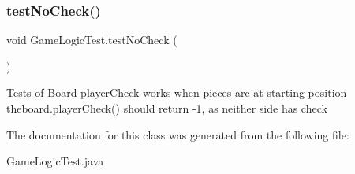 \subsubsection{\texorpdfstring{testNoCheck()}{testNoCheck()}}
{\footnotesize\ttfamily void Game\+Logic\+Test.\+test\+No\+Check (\begin{DoxyParamCaption}{ }\end{DoxyParamCaption})\hspace{0.3cm}{\ttfamily [inline]}}

Tests of \mbox{\hyperlink{class_board}{Board}} player\+Check works when pieces are at starting position theboard.\+player\+Check() should return -\/1, as neither side has check 

The documentation for this class was generated from the following file\+:\begin{DoxyCompactItemize}
\item 
Game\+Logic\+Test.\+java\end{DoxyCompactItemize}
